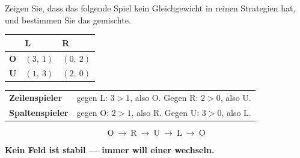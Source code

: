 \begin{aufgabe}
Zeigen Sie, dass das folgende Spiel kein Gleichgewicht in reinen Strategien hat, und bestimmen Sie das gemischte.
\begin{center}
{\small
\renewcommand{\arraystretch}{1.6}
\begin{tabular}{@{}P{1.6cm}P{2.2cm}P{2.2cm}@{}}
\toprule
& \textbf{L} & \textbf{R}\\
\midrule
\textbf{O} & $(3,\ 1)$ & $(0,\ 2)$\\
\textbf{U} & $(1,\ 3)$ & $(2,\ 0)$\\
\bottomrule
\end{tabular}}
\end{center}

\loesung
{}
\begin{center}
{\small
\renewcommand{\arraystretch}{1.5}
\begin{tabular}{@{}P{2.6cm}P{5.8cm}@{}}
\toprule
\textbf{Zeilenspieler} & gegen L: $3>1$, also O. Gegen R: $2>0$, also U.\\
\textbf{Spaltenspieler} & gegen O: $2>1$, also R. Gegen U: $3>0$, also L.\\
\bottomrule
\end{tabular}}
\end{center}

\[ \text{O} \ \to\ \text{R} \ \to\ \text{U} \ \to\ \text{L} \ \to\ \text{O} \]

\begin{center}
\end{center}

\begin{center}
\begin{minipage}{0.9\textwidth}
\textbf{Kein Feld ist stabil --- immer will einer wechseln.}
\end{minipage}
\end{center}


\end{aufgabe}
